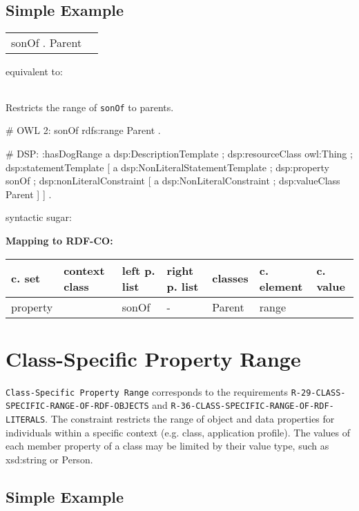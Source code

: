 \documentclass{llncs}
\newcommand{\ms}[1]{\texttt{#1}}
\newenvironment{gcotable}{
  \scriptsize
  \sffamily
  \vspace{0cm}
	\begin{center}
	\textbf{\vspace{0.4cm}Mapping to RDF-CO:} \\
  \begin{tabular}{l|l|l|l|l|l|l}
	\hline
  \textbf{c. set} & \textbf{context class} & \textbf{left p. list} & \textbf{right p. list} & \textbf{classes} & \textbf{c. element} & \textbf{c. value} \\
  \hline

}{
  \hline
  \end{tabular}
	\end{center}
}
\newenvironment{DL}{
\vspace{0cm}
	\begin{center}
  \begin{tabular}{r l}

}{
  \end{tabular}
	\end{center}
}
\begin{document}
\subsection{Simple Example}

\begin{DL}
   sonOf . Parent \\
\end{DL}

equivalent to:

\begin{DL}

\end{DL}

Restricts the range of \ms{sonOf} to parents.

\begin{ex}
# OWL 2:
sonOf rdfs:range Parent . 
\end{ex}

\begin{ex}
# DSP:
:hasDogRange
        a dsp:DescriptionTemplate ; 
        dsp:resourceClass owl:Thing ; 
        dsp:statementTemplate [
            a dsp:NonLiteralStatementTemplate ;
            dsp:property sonOf ; 
            dsp:nonLiteralConstraint [ 
                a dsp:NonLiteralConstraint ;
                dsp:valueClass Parent ] ] .
\end{ex}

syntactic sugar:

\begin{gcotable}
property &  & sonOf & - & Parent & range \\
\end{gcotable}

\section{Class-Specific Property Range}

\ms{Class-Specific Property Range} corresponds to the requirements
\ms{R-29-CLASS-} \ms{SPECIFIC-RANGE-OF-RDF-OBJECTS} and \ms{R-36-CLASS-SPECIFIC-RANGE-OF-RDF-} \ms{LITERALS}.
The constraint restricts the range of object and data properties for individuals within a specific context (e.g. class, application profile).
The values of each member property of a class may be limited by their value type, such as xsd:string or Person. 

\subsection{Simple Example}
\end{document}

